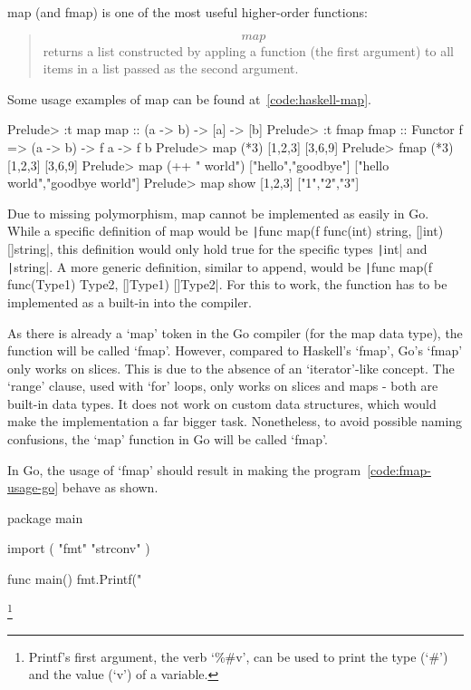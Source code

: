 map (and fmap) is one of the most useful higher-order functions:
\begin{quote}
    \[map\] returns a list constructed by appling a function (the first argument) to all
    items in a list passed as the second argument\autocite{haskell-map}.
\end{quote}

Some usage examples of map can be found at~\ref{code:haskell-map}.

\begin{code}
    \label{code:haskell-map}
    \begin{haskellcode}
Prelude> :t map
map :: (a -> b) -> [a] -> [b]
Prelude> :t fmap
fmap :: Functor f => (a -> b) -> f a -> f b
Prelude> map (*3) [1,2,3]
[3,6,9]
Prelude> fmap (*3) [1,2,3]
[3,6,9]
Prelude> map (++ " world") ["hello","goodbye"]
["hello world","goodbye world"]
Prelude> map show [1,2,3]
["1","2","3"]
    \end{haskellcode}
\end{code}
Due to missing polymorphism, map cannot be implemented as easily in Go. While
a specific definition of map would be
\texttt|func map(f func(int) string, []int) []string|,
this definition would only hold true for the specific types \texttt|int|
and \texttt|string|. A more generic definition, similar to append,
would be \texttt|func map(f func(Type1) Type2, []Type1) []Type2|. For
this to work, the function has to be implemented as a built-in into the compiler.

As there is already a `map' token in the Go compiler (for the map data type),
the function will be called `fmap'. However, compared to Haskell's `fmap',
Go's `fmap' only works on slices. This is due
to the absence of an `iterator'-like concept. The `range' clause, used with
`for' loops, only works on slices and maps - both are built-in data types. It does
not work on custom data structures, which would make the implementation a far
bigger task.
Nonetheless, to avoid possible naming confusions, the `map' function in Go will
be called `fmap'.

In Go, the usage of `fmap' should result in making the program~\ref{code:fmap-usage-go}
behave as shown.

\begin{code}
    \label{code:fmap-usage-go}
    \begin{gocode}
package main

import (
  "fmt"
  "strconv"
)

func main() {
  fmt.Printf("%
}
\end{gocode}
\footnote{Printf's first argument, the verb `\%\#v', can be used to print the type
(`\#') and the value (`v') of a variable\autocite{fmt-godoc}.}
\end{code}
